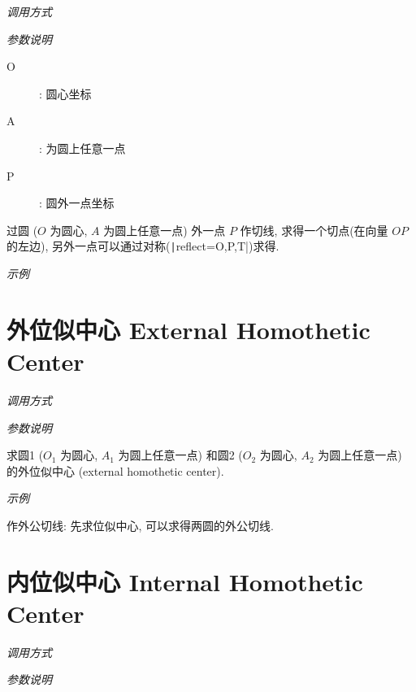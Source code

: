 \emph{调用方式}

\begin{tcolorbox}{}
\end{tcolorbox}

\emph{参数说明}

\begin{description}
  \item[O]: 圆心坐标
  \item[A]: 为圆上任意一点
  \item[P]: 圆外一点坐标
\end{description}

过圆 ($O$ 为圆心, $A$ 为圆上任意一点) 外一点 $P$ 作切线, 求得一个切点(在向量 $OP$ 的左边),
另外一点可以通过对称(\texttt|reflect={O,P,T}|)求得.

\emph{示例}


\section{外位似中心 External Homothetic Center}

\emph{调用方式}

\begin{tcolorbox}{}
\end{tcolorbox}

\emph{参数说明}

求圆1 ($O_1$ 为圆心, $A_1$ 为圆上任意一点)
和圆2 ($O_2$ 为圆心, $A_2$ 为圆上任意一点) 
的外位似中心 (external homothetic center)\cite{HOMO}.

\emph{示例}

作外公切线: 先求位似中心, 可以求得两圆的外公切线.


\section{内位似中心 Internal Homothetic Center}

\emph{调用方式}

\begin{tcolorbox}{}
\end{tcolorbox}

\emph{参数说明}


